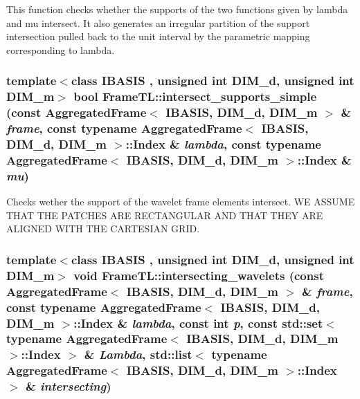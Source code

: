 This function checks whether the supports of the two functions given by lambda and mu intersect. It also generates an irregular partition of the support intersection pulled back to the unit interval by the parametric mapping corresponding to lambda. \hypertarget{namespaceFrameTL_8008f4b3d0a7bb7acab2b74a29d60222}{
\subsubsection[{intersect\_\-supports\_\-simple}]{\setlength{\rightskip}{0pt plus 5cm}template$<$class IBASIS , unsigned int DIM\_\-d, unsigned int DIM\_\-m$>$ bool FrameTL::intersect\_\-supports\_\-simple (const AggregatedFrame$<$ IBASIS, DIM\_\-d, DIM\_\-m $>$ \& {\em frame}, \/  const typename AggregatedFrame$<$ IBASIS, DIM\_\-d, DIM\_\-m $>$::Index \& {\em lambda}, \/  const typename AggregatedFrame$<$ IBASIS, DIM\_\-d, DIM\_\-m $>$::Index \& {\em mu})}}
\label{namespaceFrameTL_8008f4b3d0a7bb7acab2b74a29d60222}


Checks wether the support of the wavelet frame elements intersect. WE ASSUME THAT THE PATCHES ARE RECTANGULAR AND THAT THEY ARE ALIGNED WITH THE CARTESIAN GRID. \hypertarget{namespaceFrameTL_0005c53dfff8661290582ea77b5ebcff}{
\subsubsection[{intersecting\_\-wavelets}]{\setlength{\rightskip}{0pt plus 5cm}template$<$class IBASIS , unsigned int DIM\_\-d, unsigned int DIM\_\-m$>$ void FrameTL::intersecting\_\-wavelets (const AggregatedFrame$<$ IBASIS, DIM\_\-d, DIM\_\-m $>$ \& {\em frame}, \/  const typename AggregatedFrame$<$ IBASIS, DIM\_\-d, DIM\_\-m $>$::Index \& {\em lambda}, \/  const int {\em p}, \/  const std::set$<$ typename AggregatedFrame$<$ IBASIS, DIM\_\-d, DIM\_\-m $>$::Index $>$ \& {\em Lambda}, \/  std::list$<$ typename AggregatedFrame$<$ IBASIS, DIM\_\-d, DIM\_\-m $>$::Index $>$ \& {\em intersecting})}}
\label{namespaceFrameTL_0005c53dfff8661290582ea77b5ebcff}


